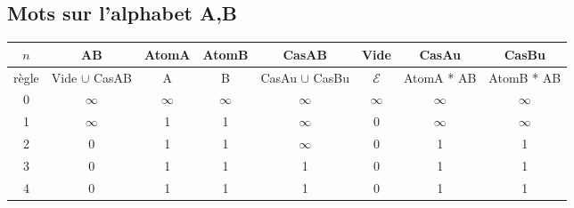 \documentclass[a4paper, titlepage]{article}
\begin{document}
\begin{table}[!hbt]
\subsection{Mots sur l'alphabet A,B}
\centering
\small
\setlength\tabcolsep{2pt}
\begin{tabular}{|c|ccccccc|}
\hline $n$ & AB & AtomA & AtomB & CasAB & Vide & CasAu & CasBu \\
\hline
\hline règle & Vide $\cup$ CasAB & A & B & CasAu $\cup$ CasBu &
$\mathcal{E}$ & AtomA * AB & AtomB * AB \\
\hline
\hline
0 & $\infty$ &  $\infty$ & $\infty$ & $\infty$ & $\infty$ & $\infty$ &$\infty$ \\
1 & $\infty$ &  1 & 1 & $\infty$ & 0 & $\infty$ &$\infty$ \\
2 & 0 &  1 & 1 & $\infty$ & 0 & 1 & 1 \\
3 & 0 &  1 & 1 & 1 & 0 & 1 & 1 \\
4 & 0 &  1 & 1 & 1 & 0 & 1 & 1 \\


\hline

\end{tabular}
\end{table}
\end{document}

